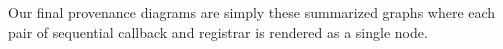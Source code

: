 Our final provenance diagrams are simply these summarized graphs where each pair of sequential callback and registrar
is rendered as a single node.







